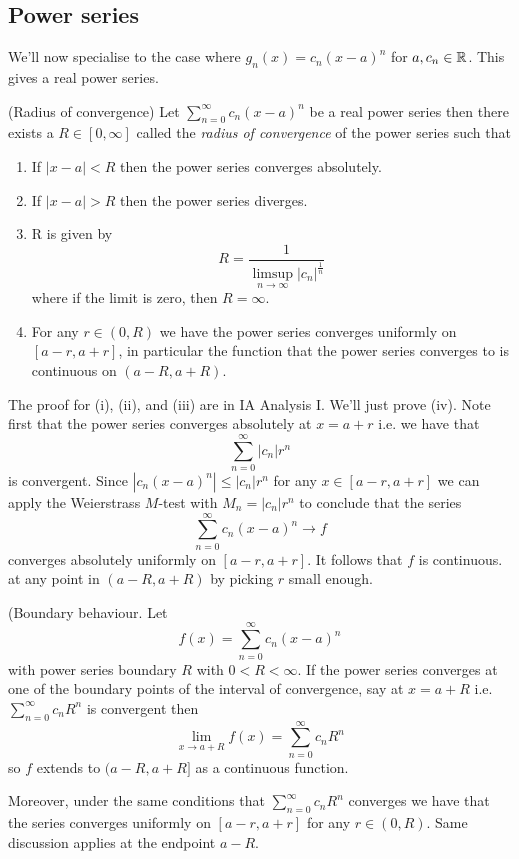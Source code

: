 \documentclass{article}
\begin{document}
\subsection{Power series}
We'll now specialise to the case where $ g_n(x)=c_n(x-a)^n $ for $ a,c_n\in \mathbb{R} $. This gives a real power series.
\begin{theorem}
	(Radius of convergence) Let $ \sum_{n=0}^\infty c_n(x-a)^n $ be a real power series then there exists a $ R\in[0,\infty] $ called the \textit{radius of convergence} of the power series such that
	\begin{enumerate}
		\item If $ |x-a|<R $ then the power series converges absolutely.
		\item If $ |x-a|>R $ then the power series diverges.
		\item R is given by
			\[
				R=\frac{1}{\limsup_{n\rightarrow\infty}|c_n|^{\frac 1n}}
			\]
			where if the limit is zero, then $ R=\infty $.
		\item For any $ r\in (0,R) $ we have the power series converges uniformly on $ [a-r,a+r] $, in particular the function that the power series converges to is continuous on $ (a-R,a+R) $.
	\end{enumerate}
\end{theorem}
\pf The proof for (i), (ii), and (iii) are in IA Analysis I. We'll just prove (iv). Note first that the power series converges absolutely at $ x=a+r $ i.e. we have that
\[
	\sum_{n=0}^\infty |c_n|r^n
\]
is convergent. Since $ |c_n(x-a)^n|\le |c_n|r^n $ for any $ x\in[a-r,a+r] $ we can apply the Weierstrass $ M $-test with $ M_n=|c_n|r^n $ to conclude that the series
\[
	\sum_{n=0}^\infty c_n(x-a)^n\to f
\]
converges absolutely uniformly on $ [a-r,a+r] $. It follows that $ f $ is continuous. at any point in $ (a-R,a+R) $ by picking $ r $ small enough.
\begin{remark}
   (Boundary behaviour. Let
   \[
	   f(x)=\sum_{n=0}^\infty c_n(x-a)^n
   \]
   with power series boundary $ R $ with $ 0< R<\infty $. If the power series converges at one of the boundary points of the interval of convergence, say at $ x=a+R $ i.e. $ \sum_{n=0}^\infty c_nR^n $ is convergent then
   \[
	   \lim_{x\to a+R}f(x)=\sum_{n=0}^\infty c_nR^n
   \]
   so $ f $ extends to $ (a-R,a+R] $ as a continuous function.
\end{remark}
Moreover, under the same conditions that $ \sum_{n=0}^\infty c_nR^n $ converges we have that the series converges uniformly on $ [a-r,a+r] $ for any $ r\in (0,R) $. Same discussion applies at the endpoint $ a-R $.
\end{document}
